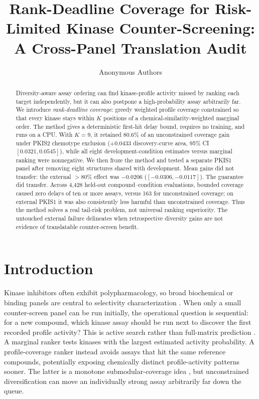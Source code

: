 \documentclass{article}
\title{Rank-Deadline Coverage for Risk-Limited Kinase Counter-Screening:\\A Cross-Panel Translation Audit}
\author{Anonymous Authors}
\begin{document}
\maketitle

\begin{abstract}
Diversity-aware assay ordering can find kinase-profile activity missed by
ranking each target independently, but it can also postpone a high-probability
assay arbitrarily far. We introduce \emph{rank-deadline coverage}: greedy
weighted profile coverage constrained so that every kinase stays within $K$
positions of a chemical-similarity-weighted marginal order. The method gives a
deterministic first-hit delay bound, requires no training, and runs on a CPU.
With $K=9$, it retained 80.6\% of an unconstrained coverage gain under PKIS2
chemotype exclusion ($+0.0433$ discovery-curve area, 95\% CI
$[0.0321,0.0545]$), while all eight development-condition estimates versus
marginal ranking were nonnegative. We then froze the method and tested a
separate PKIS1 panel after removing eight structures shared with development.
Mean gains did not transfer: the external $>80\%$ effect was $-0.0206$
($[-0.0306,-0.0117]$). The guarantee did transfer. Across 4,428 held-out
compound--condition evaluations, bounded coverage caused zero delays of ten or
more assays, versus 163 for unconstrained coverage; on external PKIS1 it was
also consistently less harmful than unconstrained coverage. Thus the method
solves a real tail-risk problem, not universal ranking superiority. The
untouched external failure delineates when retrospective diversity gains are
not evidence of translatable counter-screen benefit.
\end{abstract}

\section{Introduction}

Kinase inhibitors often exhibit polypharmacology, so broad biochemical or
binding panels are central to selectivity characterization
\citep{fabian2005,karaman2008,klaeger2017}. When only a small counter-screen
panel can be run initially, the operational question is sequential: for a new
compound, which kinase assay should be run next to discover the first recorded
profile activity? This is active search rather than full-matrix prediction
\citep{garnett2012}. A marginal ranker tests kinases with the largest estimated
activity probability. A profile-coverage ranker instead avoids assays that hit
the same reference compounds, potentially exposing chemically distinct
profile-activity patterns sooner. The latter is a monotone submodular-coverage idea
\citep{nemhauser1978,azargamzu2011}, but unconstrained diversification can move
an individually strong assay arbitrarily far down the queue.
\end{document}
